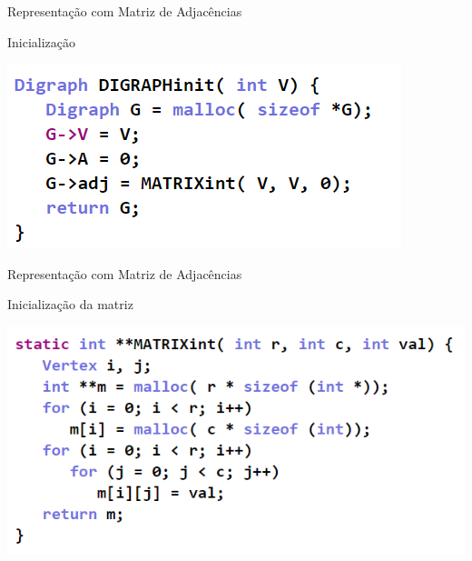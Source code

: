 \documentclass[xcolor=dvipsnames,table]{beamer}
\begin{document}
	\begin{frame}{Representação com Matriz de Adjacências}
		\begin{block}{Inicialização}
			\begin{center}
	    		\includegraphics[height=.3\textheight]{images/digraph-init.png}
	  		\end{center}
		\end{block}
	\end{frame}
	
	\begin{frame}{Representação com Matriz de Adjacências}
		\begin{block}{Inicialização da matriz}
			\begin{center}
	    		\includegraphics[height=.5\textheight]{images/matriz-adjacencias.png}
	  		\end{center}
		\end{block}
	\end{frame}
	
\end{document}
